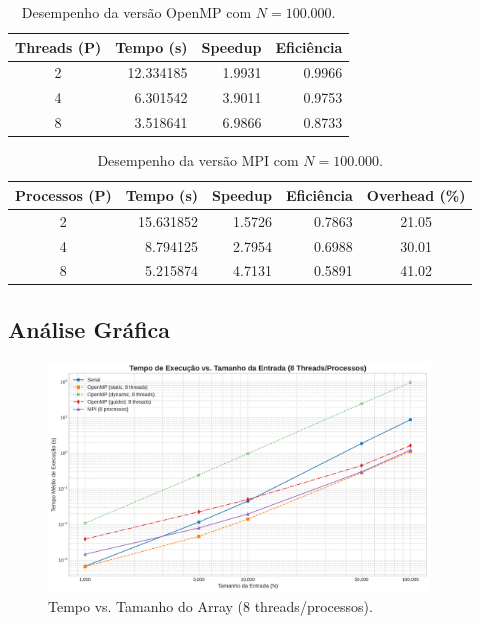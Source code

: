 \documentclass[12pt, a4paper]{article}
\begin{document}
\begin{table}[H]
\centering
\caption{Desempenho da versão OpenMP com $N=100.000$.}
\label{tab:openmp}
\begin{tabular}{@{}crrr@{}}
\toprule
\textbf{Threads (P)} & \textbf{Tempo (s)} & \textbf{Speedup} & \textbf{Eficiência} \\ \midrule
2                    & 12.334185          & 1.9931           & 0.9966              \\
4                    & 6.301542           & 3.9011           & 0.9753              \\
8                    & 3.518641           & 6.9866           & 0.8733              \\ \bottomrule
\end{tabular}
\end{table}

\begin{table}[H]
\centering
\caption{Desempenho da versão MPI com $N=100.000$.}
\label{tab:mpi}
\begin{tabular}{@{}crrrc@{}}
\toprule
\textbf{Processos (P)} & \textbf{Tempo (s)} & \textbf{Speedup} & \textbf{Eficiência} & \textbf{Overhead (\%)} \\ \midrule
2                      & 15.631852          & 1.5726           & 0.7863              & 21.05                 \\
4                      & 8.794125           & 2.7954           & 0.6988              & 30.01                 \\
8                      & 5.215874           & 4.7131           & 0.5891              & 41.02                 \\ \bottomrule
\end{tabular}
\end{table}

\subsection{Análise Gráfica}

\begin{figure}[H]
    \centering
    \includegraphics[width=0.9\textwidth]{../graficos/tempo_vs_tamanho_8_threads.png}
    \caption{Tempo vs. Tamanho do Array (8 threads/processos).}
    \label{fig:tempo_vs_tamanho}
\end{figure}
\end{document}
